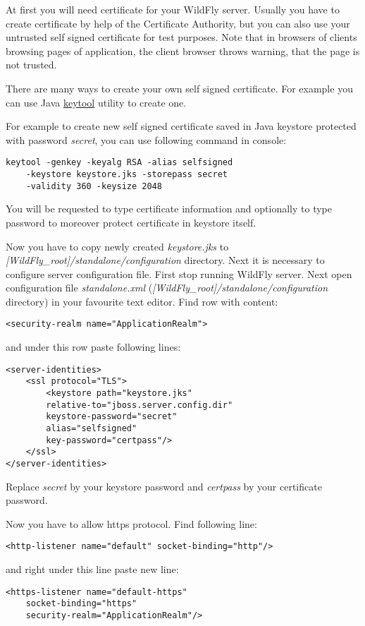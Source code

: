 \documentclass[12pt,a4paper]{article}
\begin{document}
At first you will need certificate for your WildFly server. Usually you have to create certificate by help of the Certificate Authority, but you can also use your untrusted self signed certificate for test purposes. Note that in browsers of clients browsing pages of application, the client browser throws warning, that the page is not trusted.

There are many ways to create your own self signed certificate. For example you can use Java \href{http://docs.oracle.com/javase/6/docs/technotes/tools/windows/keytool.html}{keytool} utility to create one. 

For example to create new self signed certificate saved in Java keystore protected with password \textit{secret}, you can use following command in console:
\begin{lstlisting}
keytool -genkey -keyalg RSA -alias selfsigned 
	-keystore keystore.jks -storepass secret 
	-validity 360 -keysize 2048
\end{lstlisting}
You will be requested to type certificate information and optionally to type password to moreover protect certificate in keystore itself. 

Now you have to copy newly created \textit{keystore.jks} to 
\\\textit{[WildFly\_root]/standalone/configuration} directory. Next it is necessary to configure server configuration file. First stop running WildFly server. Next open configuration file \textit{standalone.xml} (\textit{[WildFly\_root]/standalone/configuration} directory) in your favourite text editor. Find row with content:
\lstset{language=XML}
\begin{lstlisting}
<security-realm name="ApplicationRealm">
\end{lstlisting}
and under this row paste following lines:
\begin{lstlisting}
<server-identities>
	<ssl protocol="TLS">
		<keystore path="keystore.jks"
		relative-to="jboss.server.config.dir"
		keystore-password="secret" 
		alias="selfsigned"
		key-password="certpass"/>
	</ssl>
</server-identities>
\end{lstlisting}
Replace \textit{secret} by your keystore password and \textit{certpass} by your certificate password.

Now you have to allow https protocol. Find following line:
\begin{lstlisting}
<http-listener name="default" socket-binding="http"/>
\end{lstlisting}
and right under this line paste new line:
\begin{lstlisting}
<https-listener name="default-https" 
	socket-binding="https" 
	security-realm="ApplicationRealm"/>
\end{lstlisting}
\end{document}
